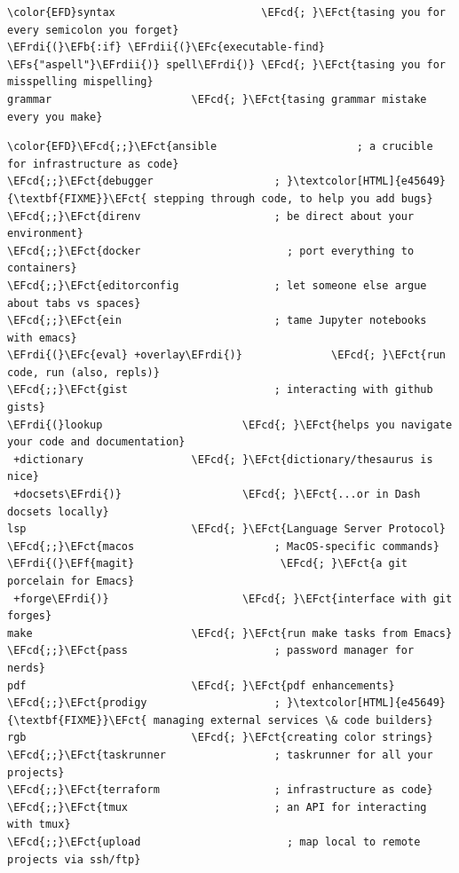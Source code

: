 \documentclass{scrartcl}
\newcommand{\EFs}[1]{\textcolor{EFs}{#1}} %
\newcommand{\EFb}[1]{\textcolor{EFb}{#1}} %
\newcommand{\EFct}[1]{\textcolor{EFct}{#1}} %
\newcommand{\EFc}[1]{\textcolor{EFc}{#1}} %
\newcommand{\EFf}[1]{\textcolor{EFf}{#1}} %
\newcommand{\EFcd}[1]{\textcolor{EFcd}{#1}} %
\newcommand{\EFrdi}[1]{\textcolor{EFrdi}{#1}} %
\newcommand{\EFrdii}[1]{\textcolor{EFrdii}{#1}} %
\begin{document}
\begin{enumerate}
\begin{Code}
\begin{Verbatim}[]
\color{EFD}syntax                       \EFcd{; }\EFct{tasing you for every semicolon you forget}
\EFrdi{(}\EFb{:if} \EFrdii{(}\EFc{executable-find} \EFs{"aspell"}\EFrdii{)} spell\EFrdi{)} \EFcd{; }\EFct{tasing you for misspelling mispelling}
grammar                      \EFcd{; }\EFct{tasing grammar mistake every you make}
\end{Verbatim}
\end{Code}

\begin{Code}
\begin{Verbatim}[]
\color{EFD}\EFcd{;;}\EFct{ansible                      ; a crucible for infrastructure as code}
\EFcd{;;}\EFct{debugger                   ; }\textcolor[HTML]{e45649}{\textbf{FIXME}}\EFct{ stepping through code, to help you add bugs}
\EFcd{;;}\EFct{direnv                     ; be direct about your environment}
\EFcd{;;}\EFct{docker                       ; port everything to containers}
\EFcd{;;}\EFct{editorconfig               ; let someone else argue about tabs vs spaces}
\EFcd{;;}\EFct{ein                        ; tame Jupyter notebooks with emacs}
\EFrdi{(}\EFc{eval} +overlay\EFrdi{)}              \EFcd{; }\EFct{run code, run (also, repls)}
\EFcd{;;}\EFct{gist                       ; interacting with github gists}
\EFrdi{(}lookup                      \EFcd{; }\EFct{helps you navigate your code and documentation}
 +dictionary                 \EFcd{; }\EFct{dictionary/thesaurus is nice}
 +docsets\EFrdi{)}                   \EFcd{; }\EFct{...or in Dash docsets locally}
lsp                          \EFcd{; }\EFct{Language Server Protocol}
\EFcd{;;}\EFct{macos                      ; MacOS-specific commands}
\EFrdi{(}\EFf{magit}                       \EFcd{; }\EFct{a git porcelain for Emacs}
 +forge\EFrdi{)}                     \EFcd{; }\EFct{interface with git forges}
make                         \EFcd{; }\EFct{run make tasks from Emacs}
\EFcd{;;}\EFct{pass                       ; password manager for nerds}
pdf                          \EFcd{; }\EFct{pdf enhancements}
\EFcd{;;}\EFct{prodigy                    ; }\textcolor[HTML]{e45649}{\textbf{FIXME}}\EFct{ managing external services \& code builders}
rgb                          \EFcd{; }\EFct{creating color strings}
\EFcd{;;}\EFct{taskrunner                 ; taskrunner for all your projects}
\EFcd{;;}\EFct{terraform                  ; infrastructure as code}
\EFcd{;;}\EFct{tmux                       ; an API for interacting with tmux}
\EFcd{;;}\EFct{upload                       ; map local to remote projects via ssh/ftp}
\end{Verbatim}
\end{Code}


\end{enumerate}
\end{document}

